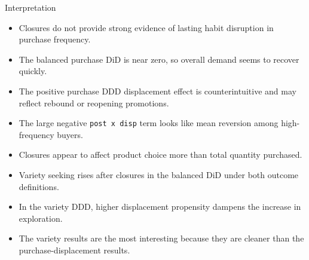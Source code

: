 \documentclass[aspectratio=169]{beamer}  %
\begin{document}
\begin{frame}{Interpretation}
\small
\begin{itemize}
    \item Closures do not provide strong evidence of lasting habit disruption in purchase frequency.
    \item The balanced purchase DiD is near zero, so overall demand seems to recover quickly.
    \item The positive purchase DDD displacement effect is counterintuitive and may reflect rebound or reopening promotions.
    \item The large negative \texttt{post x disp} term looks like mean reversion among high-frequency buyers.
    \item Closures appear to affect product choice more than total quantity purchased.
    \item Variety seeking rises after closures in the balanced DiD under both outcome definitions.
    \item In the variety DDD, higher displacement propensity dampens the increase in exploration.
    \item The variety results are the most interesting because they are cleaner than the purchase-displacement results.
\end{itemize}
\end{frame}
\end{document}
